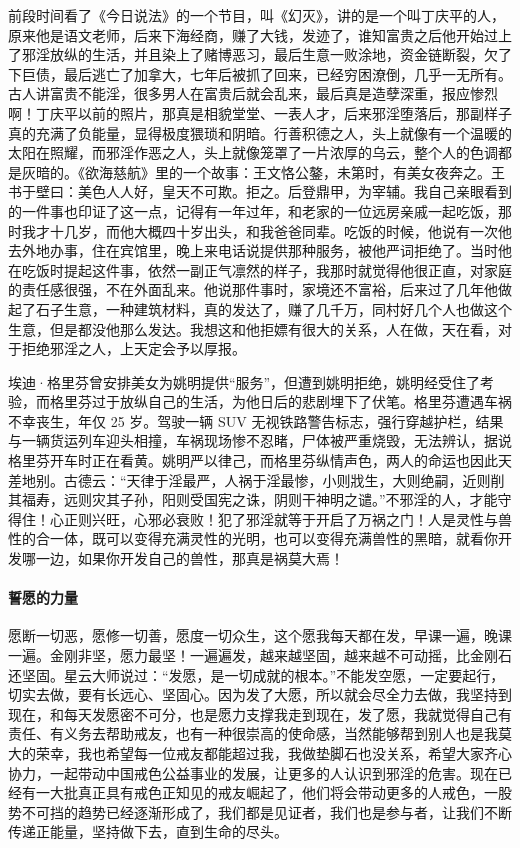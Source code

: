 前段时间看了《今日说法》的一个节目，叫《幻灭》，讲的是一个叫丁庆平的人，原来他是语文老师，后来下海经商，赚了大钱，发迹了，谁知富贵之后他开始过上了邪淫放纵的生活，并且染上了赌博恶习，最后生意一败涂地，资金链断裂，欠了下巨债，最后逃亡了加拿大，七年后被抓了回来，已经穷困潦倒，几乎一无所有。古人讲富贵不能淫，很多男人在富贵后就会乱来，最后真是造孽深重，报应惨烈啊！丁庆平以前的照片，那真是相貌堂堂、一表人才，后来邪淫堕落后，那副样子真的充满了负能量，显得极度猥琐和阴暗。行善积德之人，头上就像有一个温暖的太阳在照耀，而邪淫作恶之人，头上就像笼罩了一片浓厚的乌云，整个人的色调都是灰暗的。《欲海慈航》里的一个故事：王文恪公鏊，未第时，有美女夜奔之。王书于壁曰：美色人人好，皇天不可欺。拒之。后登鼎甲，为宰辅。我自己亲眼看到的一件事也印证了这一点，记得有一年过年，和老家的一位远房亲戚一起吃饭，那时我才十几岁，而他大概四十岁出头，和我爸爸同辈。吃饭的时候，他说有一次他去外地办事，住在宾馆里，晚上来电话说提供那种服务，被他严词拒绝了。当时他在吃饭时提起这件事，依然一副正气凛然的样子，我那时就觉得他很正直，对家庭的责任感很强，不在外面乱来。他说那件事时，家境还不富裕，后来过了几年他做起了石子生意，一种建筑材料，真的发达了，赚了几千万，同村好几个人也做这个生意，但是都没他那么发达。我想这和他拒嫖有很大的关系，人在做，天在看，对于拒绝邪淫之人，上天定会予以厚报。

埃迪·格里芬曾安排美女为姚明提供“服务”，但遭到姚明拒绝，姚明经受住了考验，而格里芬过于放纵自己的生活，为他日后的悲剧埋下了伏笔。格里芬遭遇车祸不幸丧生，年仅 25 岁。驾驶一辆 SUV 无视铁路警告标志，强行穿越护栏，结果与一辆货运列车迎头相撞，车祸现场惨不忍睹，尸体被严重烧毁，无法辨认，据说格里芬开车时正在看黄。姚明严以律己，而格里芬纵情声色，两人的命运也因此天差地别。古德云：“天律于淫最严，人祸于淫最惨，小则戕生，大则绝嗣，近则削其福寿，远则灾其子孙，阳则受国宪之诛，阴则干神明之谴。”不邪淫的人，才能守得住！心正则兴旺，心邪必衰败！犯了邪淫就等于开启了万祸之门！人是灵性与兽性的合一体，既可以变得充满灵性的光明，也可以变得充满兽性的黑暗，就看你开发哪一边，如果你开发自己的兽性，那真是祸莫大焉！

\paragraph{誓愿的力量}

愿断一切恶，愿修一切善，愿度一切众生，这个愿我每天都在发，早课一遍，晚课一遍。金刚非坚，愿力最坚！一遍遍发，越来越坚固，越来越不可动摇，比金刚石还坚固。星云大师说过：“发愿，是一切成就的根本。”不能发空愿，一定要起行，切实去做，要有长远心、坚固心。因为发了大愿，所以就会尽全力去做，我坚持到现在，和每天发愿密不可分，也是愿力支撑我走到现在，发了愿，我就觉得自己有责任、有义务去帮助戒友，也有一种很崇高的使命感，当然能够帮到别人也是我莫大的荣幸，我也希望每一位戒友都能超过我，我做垫脚石也没关系，希望大家齐心协力，一起带动中国戒色公益事业的发展，让更多的人认识到邪淫的危害。现在已经有一大批真正具有戒色正知见的戒友崛起了，他们将会带动更多的人戒色，一股势不可挡的趋势已经逐渐形成了，我们都是见证者，我们也是参与者，让我们不断传递正能量，坚持做下去，直到生命的尽头。

